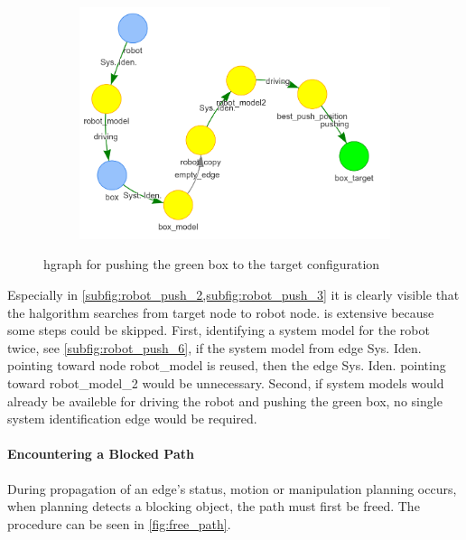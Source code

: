 \begin{figure}[H]
\begin{subfigure}{.3\textwidth}
    \includegraphics[width=1.05\textwidth]{figures/connecting_nodes/robot_push/robot_push_9}
    \caption{}\label{subfig:robot_push_9}
    \end{subfigure}
    \caption{\ac{hgraph} for pushing the green box to the target configuration}%
    \label{fig:robot_push_hgraph}
\end{figure}
Especially in \cref{subfig:robot_push_2,subfig:robot_push_3} it is clearly visible that the \ac{halgorithm} searches from target node to robot node.  is extensive because some steps could be skipped. First, identifying a system model for the robot twice, see \cref{subfig:robot_push_6}, if the system model from edge Sys. Iden. pointing toward node robot\_model is reused, then the edge Sys. Iden. pointing toward robot\_model\_2 would be unnecessary. Second, if system models would already be availeble for driving the robot and pushing the green box, no single system identification edge would be required.\bs

\paragraph{Encountering a Blocked Path}%
During propagation of an edge's status, motion or manipulation planning occurs, when planning detects a blocking object, the path must first be freed. The procedure can be seen in \cref{fig:free_path}.\bs


